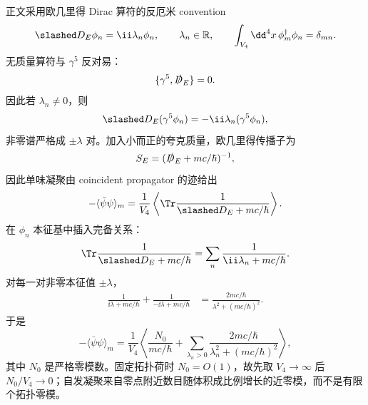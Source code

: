 \begin{derivation}
正文采用欧几里得 Dirac 算符的反厄米 convention
\begin{equation*}
 \slashed D_E\phi_n=\ii\lambda_n\phi_n,
 \qquad \lambda_n\in\mathbb R,
 \qquad
 \int_{V_4}\dd^4 x\,\phi_m^\dagger\phi_n=\delta_{mn}.
\end{equation*}
无质量算符与 $\gamma^5$ 反对易：
\begin{equation*}
 \{\gamma^5,\slashed D_E\}=0.
\end{equation*}
因此若 $\lambda_n\neq0$，则
\begin{equation*}
 \slashed D_E(\gamma^5\phi_n)
 =-\ii\lambda_n(\gamma^5\phi_n),
\end{equation*}
非零谱严格成 $\pm\lambda$ 对。加入小而正的夸克质量，欧几里得传播子为
\begin{equation*}
 S_E=(\slashed D_E+mc/\hbar)^{-1},
\end{equation*}
因此单味凝聚由 coincident propagator 的迹给出
\begin{equation*}
 -\langle\bar\psi\psi\rangle_m
 =\frac1{V_4}
 \left\langle\Tr\frac1{\slashed D_E+mc/\hbar}\right\rangle.
\end{equation*}
在 $\phi_n$ 本征基中插入完备关系：
\begin{equation*}
 \Tr\frac1{\slashed D_E+mc/\hbar}
 =\sum_n\frac1{\ii\lambda_n+mc/\hbar}.
\end{equation*}
对每一对非零本征值 $\pm\lambda$，
\begin{align*}
 \frac1{\ii\lambda+mc/\hbar}
 +\frac1{-\ii\lambda+mc/\hbar}
 &=\frac{2mc/\hbar}{\lambda^2+(mc/\hbar)^2}.
\end{align*}
于是
\begin{equation*}
 -\langle\bar\psi\psi\rangle_m
 =\frac1{V_4}\left\langle
 \frac{N_0}{mc/\hbar}
 +\sum_{\lambda_n>0}
 \frac{2mc/\hbar}{\lambda_n^2+(mc/\hbar)^2}
 \right\rangle,
\end{equation*}
其中 $N_0$ 是严格零模数。固定拓扑荷时 $N_0=O(1)$，故先取 $V_4\to\infty$ 后 $N_0/V_4\to0$；自发凝聚来自零点附近数目随体积成比例增长的近零模，而不是有限个拓扑零模。


\end{derivation}
